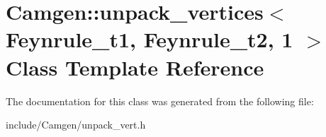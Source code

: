 \hypertarget{a00556}{\section{Camgen\-:\-:unpack\-\_\-vertices$<$ Feynrule\-\_\-t1, Feynrule\-\_\-t2, 1 $>$ Class Template Reference}
\label{a00556}
}


The documentation for this class was generated from the following file\-:\begin{DoxyCompactItemize}
\item 
include/\-Camgen/unpack\-\_\-vert.\-h\end{DoxyCompactItemize}

